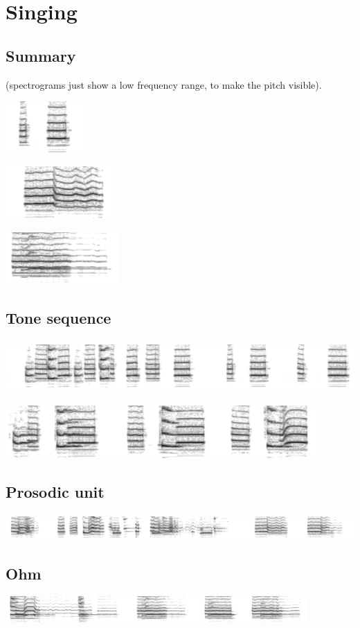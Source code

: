 
\section{Singing}

\subsection{Summary}

(spectrograms just show a low frequency range, to make the pitch visible).

\includegraphics[height=2cm]{images/chico-output-separate-high-low}

\includegraphics[height=2cm]{images/chico-output-pair-high-low}

\includegraphics[height=2cm]{images/chico-output-ohm}

\subsection{Tone sequence}

\includegraphics[height=2cm]{images/chico-separate-begin}

\includegraphics[height=2cm]{images/chico-separate-together}

\subsection{Prosodic unit}

\includegraphics[height=1cm]{images/chico-pair}

\subsection{Ohm}

\includegraphics[height=1cm]{images/chico-ohm}




